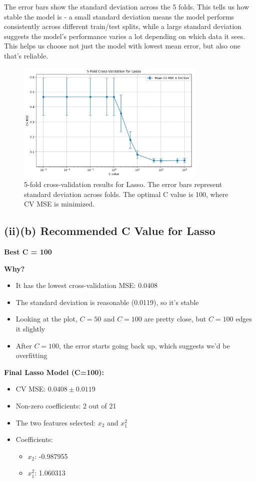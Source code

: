 \documentclass[11pt,a4paper]{article}
\begin{document}
The error bars show the standard deviation across the 5 folds. This tells us how stable the model is - a small standard deviation means the model performs consistently across different train/test splits, while a large standard deviation suggests the model's performance varies a lot depending on which data it sees. This helps us choose not just the model with lowest mean error, but also one that's reliable.

\begin{figure}[H]
\centering
\includegraphics[width=0.8\textwidth]{figures/06_lasso_cv_results.png}
\caption{5-fold cross-validation results for Lasso. The error bars represent standard deviation across folds. The optimal C value is 100, where CV MSE is minimized.}
\label{fig:lasso_cv}
\end{figure}

\subsection*{(ii)(b) Recommended C Value for Lasso}

\textbf{Best C = 100}

\textbf{Why?}
\begin{itemize}
    \item It has the lowest cross-validation MSE: 0.0408
    \item The standard deviation is reasonable (0.0119), so it's stable
    \item Looking at the plot, $C=50$ and $C=100$ are pretty close, but $C=100$ edges it slightly
    \item After $C=100$, the error starts going back up, which suggests we'd be overfitting
\end{itemize}

\textbf{Final Lasso Model (C=100):}
\begin{itemize}
    \item CV MSE: $0.0408 \pm 0.0119$
    \item Non-zero coefficients: 2 out of 21
    \item The two features selected: $x_2$ and $x_1^2$
    \item Coefficients: 
    \begin{itemize}
        \item $x_2$: -0.987955
        \item $x_1^2$: 1.060313
    \end{itemize}
\end{itemize}
\end{document}
